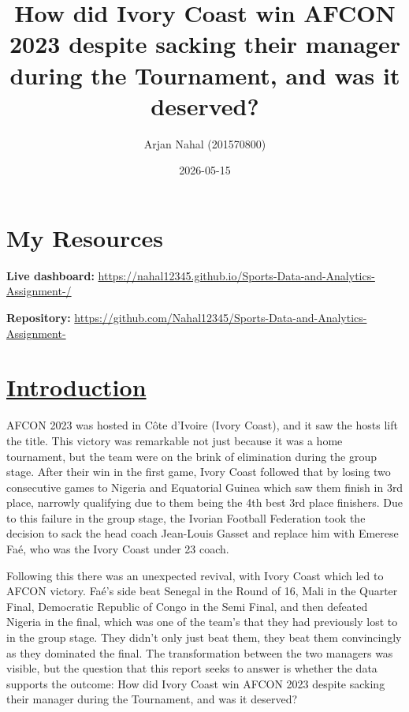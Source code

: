 \documentclass[
  11pt,
  letterpaper,
  DIV=11,
  numbers=noendperiod]{scrartcl}
\title{How did Ivory Coast win AFCON 2023 despite sacking their manager
during the Tournament, and was it deserved?}
\author{Arjan Nahal (201570800)}
\date{2026-05-15}
\renewcommand*\contentsname{Table of contents}
\newcommand\contentsname{Table of contents}
\begin{document}
\maketitle

\renewcommand*\contentsname{Table of contents}
{
\hypersetup{linkcolor=}
\setcounter{tocdepth}{3}
\tableofcontents
}
\listoffigures
\listoftables

\section{My Resources}\label{my-resources}

\textbf{Live dashboard:}
\url{https://nahal12345.github.io/Sports-Data-and-Analytics-Assignment-/}

\textbf{Repository:}
\url{https://github.com/Nahal12345/Sports-Data-and-Analytics-Assignment-}

\newpage{}

\section{\texorpdfstring{\ul{Introduction}}{Introduction}}\label{introduction}

AFCON 2023 was hosted in Côte d'Ivoire (Ivory Coast), and it saw the
hosts lift the title. This victory was remarkable not just because it
was a home tournament, but the team were on the brink of elimination
during the group stage. After their win in the first game, Ivory Coast
followed that by losing two consecutive games to Nigeria and Equatorial
Guinea which saw them finish in 3rd place, narrowly qualifying due to
them being the 4th best 3rd place finishers. Due to this failure in the
group stage, the Ivorian Football Federation took the decision to sack
the head coach Jean-Louis Gasset and replace him with Emerese Faé, who
was the Ivory Coast under 23 coach.

Following this there was an unexpected revival, with Ivory Coast which
led to AFCON victory. Faé's side beat Senegal in the Round of 16, Mali
in the Quarter Final, Democratic Republic of Congo in the Semi Final,
and then defeated Nigeria in the final, which was one of the team's that
they had previously lost to in the group stage. They didn't only just
beat them, they beat them convincingly as they dominated the final. The
transformation between the two managers was visible, but the question
that this report seeks to answer is whether the data supports the
outcome: How did Ivory Coast win AFCON 2023 despite sacking their
manager during the Tournament, and was it deserved?
\end{document}
